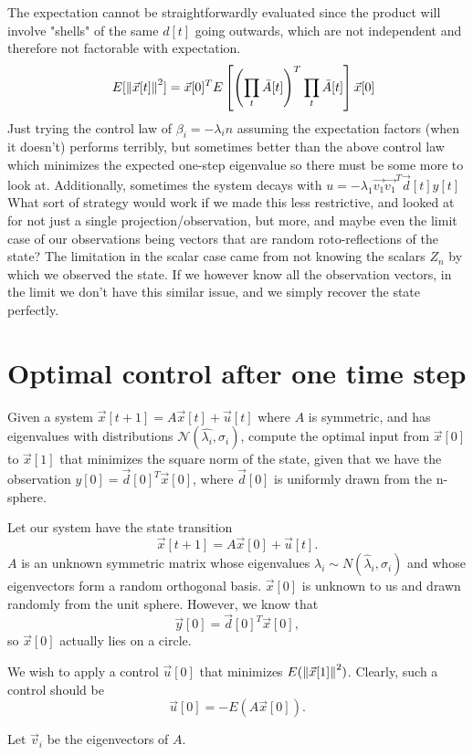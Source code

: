\documentclass[letterpaper]{article}
\theoremstyle{remark}
\newcommand{\eqn}[1]{\begin{alignat*}{2}#1\end{alignat*}}
\begin{document}
The expectation cannot be straightforwardly evaluated since the product will involve "shells" of the same $d[t]$ going outwards, which are not independent and therefore not factorable with expectation.
\eqn{
&&E[\norm{\vec{x}[t]}^2] &= \vec{x}[0]^TE\left[\left(\prod_t\bar{A}[t]\right)^T\prod_t\bar{A}[t]\right]\vec{x}[0]\\
}
Just trying the control law of $\beta_i = -\lambda_in$ assuming the expectation factors (when it doesn't) performs terribly, but sometimes better than the above control law which minimizes the expected one-step eigenvalue so there must be some more to look at. Additionally, sometimes the system decays with $u = -\lambda_1\vec{v_1}\vec{v_1}^T\vec{d}[t]y[t]$ What sort of strategy would work if we made this less restrictive, and looked at for not just a single projection/observation, but more, and maybe even the limit case of our observations being vectors that are random roto-reflections of the state? The limitation in the scalar case came from not knowing the scalars $Z_n$ by which we observed the state. If we however know all the observation vectors, in the limit we don't have this similar issue, and we simply recover the state perfectly.

\section*{Optimal control after one time step}
Given a system $\vec{x}[t+1] = A\vec{x}[t] + \vec{u}[t]$ where $A$ is symmetric, and has eigenvalues with distributions $\mathcal{N}(\hat{\lambda_i}, \sigma_i)$, compute the optimal input from $\vec{x}[0]$ to $\vec{x}[1]$ that minimizes the square norm of the state, given that we have the observation $y[0] = \vec{d}[0]^T\vec{x}[0]$, where $\vec{d}[0]$ is uniformly drawn from the n-sphere.


Let our system have the state transition
\[
    \vec{x}[t + 1] = A\vec{x}[0] + \vec{u}[t].
\]
$A$ is an unknown symmetric matrix whose eigenvalues $\lambda_i \sim N(\hat{\lambda}_i, \sigma_i)$ and whose eigenvectors form a random orthogonal basis. $\vec{x}[0]$ is unknown to us and drawn randomly from the unit sphere. However, we know that
\[
    \vec{y}[0] = \vec{d}[0]^T\vec{x}[0],
\]
so $\vec{x}[0]$ actually lies on a circle.

We wish to apply a control $\vec{u}[0]$ that minimizes $E(\norm{\vec{x}[1]}^2)$. Clearly, such a control should be
\[
    \vec{u}[0] = -E(A\vec{x}[0]).
\]

Let $\vec{v}_i$ be the eigenvectors of $A$.
\end{document}
